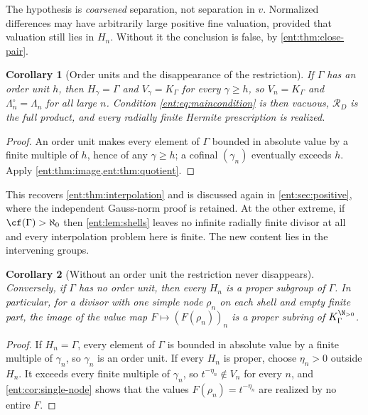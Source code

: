 \documentclass[11pt]{article}
\theoremstyle{plain}
\theoremstyle{plain}
\theoremstyle{plain}
\newtheorem{corollary}[corollary]{Corollary}
\theoremstyle{definition}
\theoremstyle{definition}
\theoremstyle{definition}
\theoremstyle{definition}
\theoremstyle{remark}
\newcommand{\K}{K_\Gamma}\newcommand{\KD}{K_\Delta}
\newcommand{\RD}{\mathcal R_D}\newcommand{\Ucal}{\mathcal U}
\begin{document}
The hypothesis is \emph{coarsened} separation, not separation in $v$.
Normalized differences may have arbitrarily large positive fine valuation,
provided that valuation still lies in $H_n$. Without it the conclusion is
false, by \cref{ent:thm:close-pair}.

\begin{corollary}[Order units and the disappearance of the restriction]
\label{ent:cor:order-unit-image}
If $\Gamma$ has an order unit $h$, then $H_\gamma=\Gamma$ and $V_\gamma=\K$
for every $\gamma\ge h$, so $V_n=\K$ and $\Lambda_n^\circ=\Lambda_n$ for all
large $n$. Condition \eqref{ent:eq:maincondition} is then vacuous, $\RD$ is
the full product, and every radially finite Hermite prescription is realized.
\end{corollary}
\begin{proof}
An order unit makes every element of $\Gamma$ bounded in absolute value by a
finite multiple of $h$, hence of any $\gamma\ge h$; a cofinal $(\gamma_n)$
eventually exceeds $h$. Apply \cref{ent:thm:image,ent:thm:quotient}.
\end{proof}

This recovers \cref{ent:thm:interpolation} and is discussed again in
\cref{ent:sec:positive}, where the independent Gauss-norm proof is retained.
At the other extreme, if $\cf(\Gamma)>\aleph_0$ then \cref{ent:lem:shells}
leaves no infinite radially finite divisor at all and every interpolation
problem here is finite. The new content lies in the intervening groups.

\begin{corollary}[Without an order unit the restriction never disappears]
\label{ent:sm:cor:no-order-unit}
Conversely, if $\Gamma$ has no order unit, then every $H_n$ is a proper
subgroup of $\Gamma$. In particular, for a divisor with one simple node
$\rho_n$ on each shell and empty finite part, the image of the value map
$F\mapsto(F(\rho_n))_n$ is a proper subring of $\K^{\N_{>0}}$.
\end{corollary}
\begin{proof}
If $H_n=\Gamma$, every element of $\Gamma$ is bounded in absolute value by a
finite multiple of $\gamma_n$, so $\gamma_n$ is an order unit. If every $H_n$
is proper, choose $\eta_n>0$ outside $H_n$. It exceeds every finite multiple
of $\gamma_n$, so $t^{-\eta_n}\notin V_n$ for every $n$, and
\cref{ent:cor:single-node} shows that the values $F(\rho_n)=t^{-\eta_n}$ are
realized by no entire $F$.
\end{proof}
\end{document}
